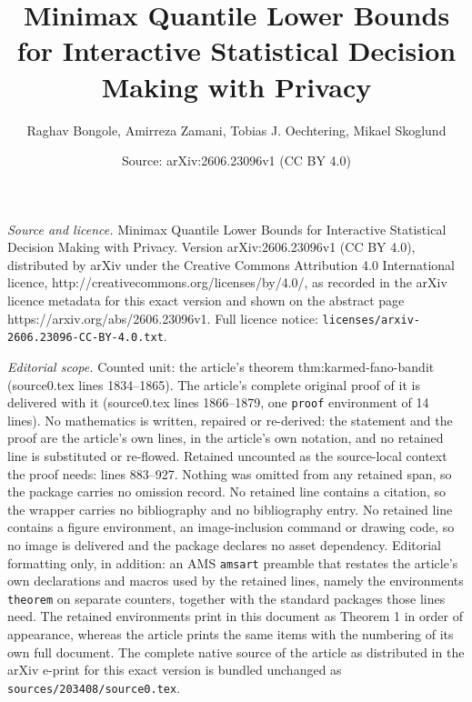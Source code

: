 \documentclass[10pt,a4paper]{amsart}
\title{Minimax Quantile Lower Bounds for Interactive Statistical Decision Making with Privacy}
\author{Raghav Bongole, Amirreza Zamani, Tobias J. Oechtering, Mikael Skoglund}
\date{Source: arXiv:2606.23096v1 (CC BY 4.0)}
\begin{document}
\maketitle

\noindent\emph{Source and licence.} Minimax Quantile Lower Bounds for Interactive Statistical Decision Making with Privacy. Version arXiv:2606.23096v1 (CC BY 4.0), distributed by arXiv under the Creative Commons Attribution 4.0 International licence, http://creativecommons.org/licenses/by/4.0/, as recorded in the arXiv licence metadata for this exact version and shown on the abstract page https://arxiv.org/abs/2606.23096v1. Full licence notice: \texttt{licenses/arxiv-2606.23096-CC-BY-4.0.txt}.\par\smallskip

\noindent\textit{Editorial scope.} Counted unit: the article's theorem thm:karmed-fano-bandit (source0.tex lines 1834--1865). The article's complete original proof of it is delivered with it (source0.tex lines 1866--1879, one \texttt{proof} environment of 14 lines). No mathematics is written, repaired or re-derived: the statement and the proof are the article's own lines, in the article's own notation, and no retained line is substituted or re-flowed.  Retained uncounted as the source-local context the proof needs: lines 883--927.  Nothing was omitted from any retained span, so the package carries no omission record.  No retained line contains a citation, so the wrapper carries no bibliography and no bibliography entry.  No retained line contains a figure environment, an image-inclusion command or drawing code, so no image is delivered and the package declares no asset dependency.  Editorial formatting only, in addition: an AMS \texttt{amsart} preamble that restates the article's own declarations and macros used by the retained lines, namely the environments \texttt{theorem} on separate counters, together with the standard packages those lines need.  The retained environments print in this document as Theorem 1 in order of appearance, whereas the article prints the same items with the numbering of its own full document.  The complete native source of the article as distributed in the arXiv e-print for this exact version is bundled unchanged as \texttt{sources/203408/source0.tex}.
\end{document}
